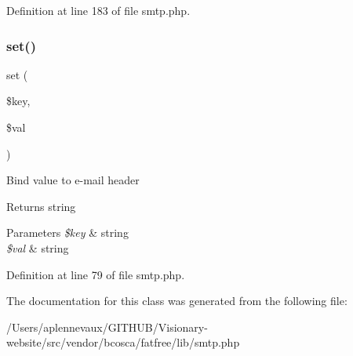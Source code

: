 Definition at line 183 of file smtp.\+php.

\hypertarget{class_s_m_t_p_ac8d8012023e560c81f55a629022cb65a}{}\label{class_s_m_t_p_ac8d8012023e560c81f55a629022cb65a} 
\subsubsection{\texorpdfstring{set()}{set()}}
{\footnotesize\ttfamily set (\begin{DoxyParamCaption}\item[{}]{\$key,  }\item[{}]{\$val }\end{DoxyParamCaption})}

Bind value to e-\/mail header \begin{DoxyReturn}{Returns}
string 
\end{DoxyReturn}

\begin{DoxyParams}{Parameters}
{\em \$key} & string \\
\hline
{\em \$val} & string \\
\hline
\end{DoxyParams}


Definition at line 79 of file smtp.\+php.



The documentation for this class was generated from the following file\+:\begin{DoxyCompactItemize}
\item 
/\+Users/aplennevaux/\+G\+I\+T\+H\+U\+B/\+Visionary-\/website/src/vendor/bcosca/fatfree/lib/smtp.\+php\end{DoxyCompactItemize}
